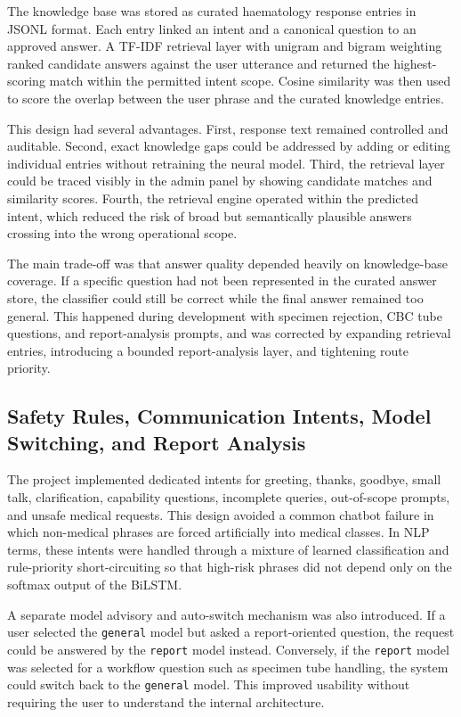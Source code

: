 The knowledge base was stored as curated haematology response entries in JSONL format. Each entry linked an intent and a canonical question to an approved answer. A TF-IDF retrieval layer with unigram and bigram weighting ranked candidate answers against the user utterance and returned the highest-scoring match within the permitted intent scope. Cosine similarity was then used to score the overlap between the user phrase and the curated knowledge entries.

This design had several advantages. First, response text remained controlled and auditable. Second, exact knowledge gaps could be addressed by adding or editing individual entries without retraining the neural model. Third, the retrieval layer could be traced visibly in the admin panel by showing candidate matches and similarity scores. Fourth, the retrieval engine operated within the predicted intent, which reduced the risk of broad but semantically plausible answers crossing into the wrong operational scope.

The main trade-off was that answer quality depended heavily on knowledge-base coverage. If a specific question had not been represented in the curated answer store, the classifier could still be correct while the final answer remained too general. This happened during development with specimen rejection, CBC tube questions, and report-analysis prompts, and was corrected by expanding retrieval entries, introducing a bounded report-analysis layer, and tightening route priority.

\subsection{Safety Rules, Communication Intents, Model Switching, and Report Analysis}

The project implemented dedicated intents for greeting, thanks, goodbye, small talk, clarification, capability questions, incomplete queries, out-of-scope prompts, and unsafe medical requests. This design avoided a common chatbot failure in which non-medical phrases are forced artificially into medical classes. In NLP terms, these intents were handled through a mixture of learned classification and rule-priority short-circuiting so that high-risk phrases did not depend only on the softmax output of the BiLSTM.

A separate model advisory and auto-switch mechanism was also introduced. If a user selected the \texttt{general} model but asked a report-oriented question, the request could be answered by the \texttt{report} model instead. Conversely, if the \texttt{report} model was selected for a workflow question such as specimen tube handling, the system could switch back to the \texttt{general} model. This improved usability without requiring the user to understand the internal architecture.


